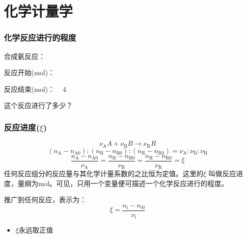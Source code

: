 \section{化学计量学}





\begin{frame}
    \frametitle{化学反应进行的程度}
    \begin{question}
      合成氨反应：
      \begin{center}
  
      反应开始(mol)：    \qquad  {} \qquad  \qquad \qquad  \qquad  \qquad  \qquad
  
      反应结束(mol)：   \quad ~  4  \qquad  {} \qquad \qquad \qquad  \qquad  \qquad  \qquad  \qquad
      \end{center}
      
      这个反应进行了多少？
    \end{question}
\end{frame}


\begin{frame}
    \frametitle{反应进度($\xi$)}
    \[
        {\nu_\mathrm{A}}{A}+{\nu_\mathrm{B}}{B}\to{\nu_\mathrm{R}}{R}
    \]
    \[
        (n_{\mathrm{A}}-n_{\mathrm{A0}}):(n_{\mathrm{B}}-n_{\mathrm{B0}}):(n_{\mathrm{R}}-n_{\mathrm{R0}})=\nu_{\mathrm{A}}:\nu_{\mathrm{B}}:\nu_{\mathrm{R}}
    \]
    \[
        \frac{n_{\mathrm{A}}-n_\mathrm{A0}}{\nu_{\mathrm{A}}}=\frac{n_{\mathrm{B}}-n_\mathrm{B0}}{\nu_{\mathrm{B}}}=\frac{n_{\mathrm{R}}-n_\mathrm{R0}}{\nu_{\mathrm{R}}}=\xi 
    \]
    任何反应组分的反应量与其化学计量系数的之比恒为定值。这里的$\xi$ 叫做反应进度，量纲为mol。可见，只用一个变量便可描述一个化学反应进行的程度。

    推广到任何反应，表示为：
    \[
        \xi=\frac{n_\mathrm{i}-n_\mathrm{i0}}{\nu_\mathrm{i}}
    \]
    \begin{itemize}
      \item $\xi$永远取正值
    \end{itemize}
\end{frame}



